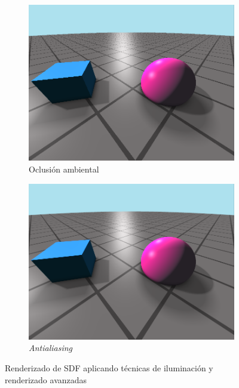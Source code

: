 \begin{figure}[ht!]
\begin{subfigure}[b]{0.45\textwidth}
        \includegraphics[width=\textwidth]{Plantilla-TFG-master/img/escena7_AO.png}
        \caption{Oclusión ambiental}
    \end{subfigure}
    \hfill
    \begin{subfigure}[b]{0.45\textwidth}
        \centering
        \includegraphics[width=\textwidth]{Plantilla-TFG-master/img/escena9_AA3.png}
        \caption{\textit{Antialiasing}}
    \end{subfigure}

    \caption{Renderizado de SDF aplicando técnicas de iluminación y renderizado avanzadas}
\end{figure}


\endinput
